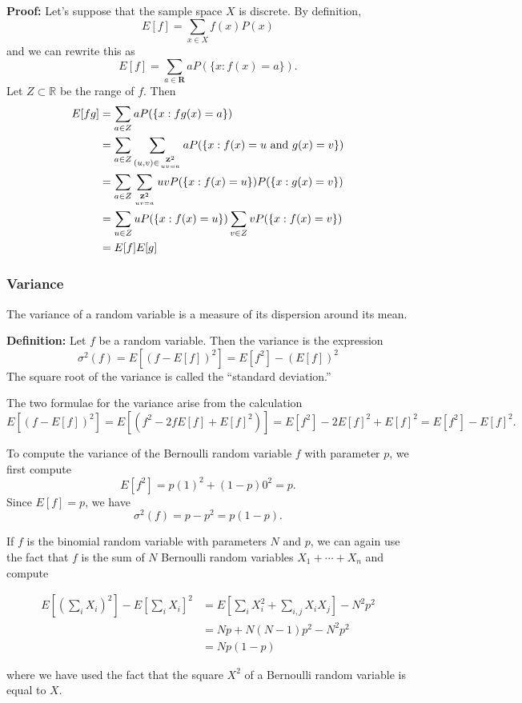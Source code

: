 \documentclass[
  11pt,
  letterpaper,
]{scrbook}
\theoremstyle{plain}
\theoremstyle{remark}
\begin{document}
\textbf{Proof:} Let's suppose that the sample space \(X\) is discrete.
By definition, \[
E[f]=\sum_{x\in X}f(x)P(x)
\] and we can rewrite this as \[
E[f]=\sum_{a\in\mathbf{R}} aP(\{x: f(x)=a\}).
\] Let \(Z\subset\mathbb{R}\) be the range of \(f\). Then \begin{align*}
E[fg]&=\sum_{a\in Z} aP(\{x: fg(x)=a\}) \\
&=\sum_{a\in Z}\sum_{(u,v)\in\genfrac{}{}{0pt}{}{\mathbf{Z}^{2}}{uv=a}}aP(\{x:f(x)=u\hbox{\ and\ }g(x)=v\}) \\
&=\sum_{a\in Z}\sum_{\genfrac{}{}{0pt}{}{\mathbf{Z}^{2}}{uv=a}}uvP(\{x:f(x)=u\})P(\{x:g(x)=v\}) \\
&=\sum_{u\in Z}uP(\{x:f(x)=u\})\sum_{v\in Z}vP(\{x:f(x)=v\}) \\
&=E[f]E[g]
\end{align*}

\hypertarget{variance-1}{%
\subsubsection{Variance}\label{variance-1}}

The variance of a random variable is a measure of its dispersion around
its mean.

\textbf{Definition:} Let \(f\) be a random variable. Then the variance
is the expression \[
\sigma^2(f) = E[(f-E[f])^2]=E[f^2]-(E[f])^2
\] The square root of the variance is called the ``standard deviation.''

The two formulae for the variance arise from the calculation \[
E[(f-E[f])^2]=E[(f^2-2fE[f]+E[f]^2)]=E[f^2]-2E[f]^2+E[f]^2=E[f^2]-E[f]^2.
\]

To compute the variance of the Bernoulli random variable \(f\) with
parameter \(p\), we first compute \[
E[f^2]=p(1)^2+(1-p)0^2=p.
\] Since \(E[f]=p\), we have \[
\sigma^2(f)=p-p^2=p(1-p).
\]

If \(f\) is the binomial random variable with parameters \(N\) and
\(p\), we can again use the fact that \(f\) is the sum of \(N\)
Bernoulli random variables \(X_1+\cdots+X_n\) and compute

\begin{align*}
E[(\sum_{i}X_i)^2]-E[\sum_{i} X_{i}]^2 &=E[\sum_{i} X_i^2+\sum_{i,j}X_{i}X_{j}]-N^2p^2\\
&=Np+N(N-1)p^2-N^2p^2 \\
&=Np(1-p)
\end{align*}

where we have used the fact that the square \(X^2\) of a Bernoulli
random variable is equal to \(X\).
\end{document}

